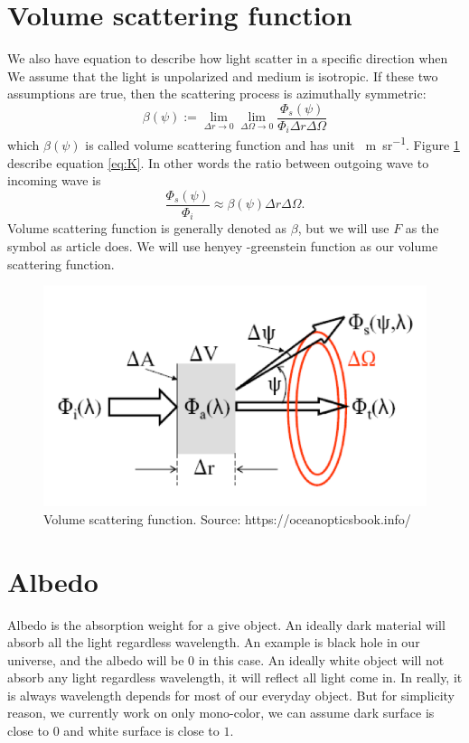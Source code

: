 \documentclass{article}
\begin{document}
\section{Volume scattering function}
We also have equation to describe how light scatter in a specific direction when We assume that the light is unpolarized and medium is isotropic. If these two assumptions are true, then the scattering process is azimuthally symmetric:
\begin{equation}
    \beta(\psi) := \lim_{\Delta r \to 0} \lim_{\Delta \Omega \to 0} \frac{\Phi_s(\psi)}{\Phi_i \Delta r \Delta \Omega}
\end{equation}
which $\beta(\psi)$ is called volume scattering function and has unit \si{\per\meter\per\steradian}. Figure \ref{fig:scattering} describe equation \ref{eq:K}. In other words the ratio between outgoing wave to incoming wave is 
\begin{equation}
    \frac{\Phi_s(\psi)}{\Phi_i} \approx \beta(\psi)\Delta r \Delta \Omega.
\end{equation}
Volume scattering function is generally denoted as $\beta$, but we will use $F$ as the symbol as article \cite{gupta2008controlling} does. We will use henyey -greenstein function as our volume scattering function.

\begin{figure}[h]
    \centering
    \includegraphics[width=\textwidth]{scattering.png}
    \caption{Volume scattering function. Source: https://oceanopticsbook.info/}
    \label{fig:scattering}
\end{figure}

\section{Albedo}
Albedo is the absorption weight for a give object. An ideally dark material will absorb all the light regardless wavelength. An example is black hole in our universe, and the albedo will be $0$ in this case. An ideally white object will not absorb any light regardless wavelength, it will reflect all light come in. In really, it is always wavelength depends for most of our everyday object. But for simplicity reason, we currently work on only mono-color, we can assume dark surface is close to $0$ and white surface is close to $1$.
\end{document}
